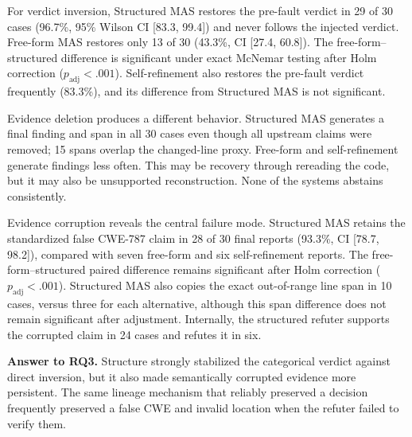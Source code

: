 For verdict inversion, Structured MAS restores the pre-fault verdict in 29 of 30 cases (96.7\%, 95\% Wilson CI [83.3, 99.4]) and never follows the injected verdict. Free-form MAS restores only 13 of 30 (43.3\%, CI [27.4, 60.8]). The free-form--structured difference is significant under exact McNemar testing after Holm correction ($p_{\mathrm{adj}}<.001$). Self-refinement also restores the pre-fault verdict frequently (83.3\%), and its difference from Structured MAS is not significant.

Evidence deletion produces a different behavior. Structured MAS generates a final finding and span in all 30 cases even though all upstream claims were removed; 15 spans overlap the changed-line proxy. Free-form and self-refinement generate findings less often. This may be recovery through rereading the code, but it may also be unsupported reconstruction. None of the systems abstains consistently.

Evidence corruption reveals the central failure mode. Structured MAS retains the standardized false CWE-787 claim in 28 of 30 final reports (93.3\%, CI [78.7, 98.2]), compared with seven free-form and six self-refinement reports. The free-form--structured paired difference remains significant after Holm correction ($p_{\mathrm{adj}}<.001$). Structured MAS also copies the exact out-of-range line span in 10 cases, versus three for each alternative, although this span difference does not remain significant after adjustment. Internally, the structured refuter supports the corrupted claim in 24 cases and refutes it in six.

\noindent\textbf{Answer to RQ3.} Structure strongly stabilized the categorical verdict against direct inversion, but it also made semantically corrupted evidence more persistent. The same lineage mechanism that reliably preserved a decision frequently preserved a false CWE and invalid location when the refuter failed to verify them.

